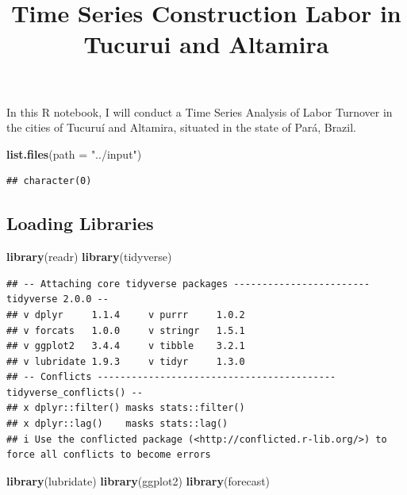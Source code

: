 \documentclass[
]{article}
\title{Time Series Construction Labor in Tucurui and Altamira}
\author{}
\date{\vspace{-2.5em}}
\newenvironment{Shaded}{\begin{snugshade}}{\end{snugshade}}
\newcommand{\AttributeTok}[1]{\textcolor[rgb]{0.13,0.29,0.53}{#1}}
\newcommand{\FunctionTok}[1]{\textcolor[rgb]{0.13,0.29,0.53}{\textbf{#1}}}
\newcommand{\NormalTok}[1]{#1}
\newcommand{\StringTok}[1]{\textcolor[rgb]{0.31,0.60,0.02}{#1}}
\begin{document}
\maketitle

In this R notebook, I will conduct a Time Series Analysis of Labor
Turnover in the cities of Tucuruí and Altamira, situated in the state of
Pará, Brazil.

\begin{Shaded}
\begin{Highlighting}[]
\FunctionTok{list.files}\NormalTok{(}\AttributeTok{path =} \StringTok{"../input"}\NormalTok{)}
\end{Highlighting}
\end{Shaded}

\begin{verbatim}
## character(0)
\end{verbatim}

\hypertarget{loading-libraries}{%
\subsection{Loading Libraries}\label{loading-libraries}}

\begin{Shaded}
\begin{Highlighting}[]
\FunctionTok{library}\NormalTok{(readr)}
\FunctionTok{library}\NormalTok{(tidyverse)}
\end{Highlighting}
\end{Shaded}

\begin{verbatim}
## -- Attaching core tidyverse packages ------------------------ tidyverse 2.0.0 --
## v dplyr     1.1.4     v purrr     1.0.2
## v forcats   1.0.0     v stringr   1.5.1
## v ggplot2   3.4.4     v tibble    3.2.1
## v lubridate 1.9.3     v tidyr     1.3.0
## -- Conflicts ------------------------------------------ tidyverse_conflicts() --
## x dplyr::filter() masks stats::filter()
## x dplyr::lag()    masks stats::lag()
## i Use the conflicted package (<http://conflicted.r-lib.org/>) to force all conflicts to become errors
\end{verbatim}

\begin{Shaded}
\begin{Highlighting}[]
\FunctionTok{library}\NormalTok{(lubridate)}
\FunctionTok{library}\NormalTok{(ggplot2)}
\FunctionTok{library}\NormalTok{(forecast)}
\end{Highlighting}
\end{Shaded}
\end{document}
